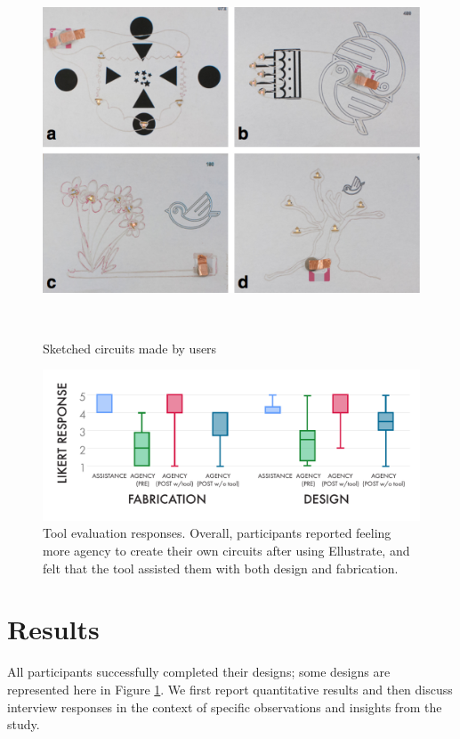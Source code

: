 \documentclass{sigchi}
\begin{document}
\begin{figure}[h]
\centering
  \includegraphics[width=1\columnwidth]{figures/Ellustrate_figures_Users_artwork}
  \caption{Sketched circuits made by users}~\label{fig:user-artwork}
  \vspace{-20pt}
\end{figure}




\begin{figure}[t]
\centering
\includegraphics[width=1.0\columnwidth]{charts/boxplots_quant.pdf}
\caption{Tool evaluation responses. Overall, participants reported feeling more agency to create their own circuits after using Ellustrate, and felt that the tool assisted them with both design and fabrication.}
\label{fig:fab_tool_results}
\vspace{-20pt}
\end{figure}

\section{Results}
All participants successfully completed their designs; some designs are represented here in Figure \ref{fig:user-artwork}. 
We first report quantitative results and then discuss interview responses in the context of specific observations and insights from the study.
\end{document}
